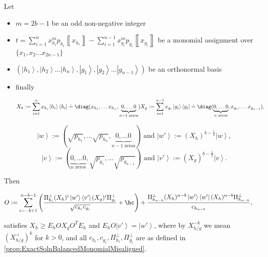 \documentclass{article}
\begin{document}
\begin{proposition}
  \label{prop:ExactSolnUnbalancedMonomialMisaligned}Let
  \begin{itemize}
    \item $m=2b-1$ be an odd non-negative integer
    \item $
            t=\sum_{i=1}^{n}x_{h_{i}}^{m}p_{h_{i}}\left\llbracket x_{h_{i}}\right\rrbracket -\sum_{i=1}^{n-1}x_{g_{i}}^{m}p_{g_{i}}\left\llbracket x_{g_{i}}\right\rrbracket
          $ be a monomial assignment over $\{x_{1},x_{2}\dots x_{2n-1}\}$
    \item $\left(\left|h_{1}\right\rangle ,\left|h_{2}\right\rangle \dots\left|h_{n}\right\rangle ,\left|g_{1}\right\rangle ,\left|g_{2}\right\rangle \dots\left|g_{n-1}\right\rangle \right)$
          be an orthonormal basis
    \item finally
          \begin{footnotesize}
            \begin{displaymath}
              X_{h}:=\sum_{i=1}^{n}x_{h_{i}}\left|h_{i}\right\rangle \left\langle h_{i}\right|\doteq\diag(x_{h_{1}},\dots x_{h_{n}},\underbrace{0,\dots0}_{n-1\text{ zeros}})
              X_{g}:=\sum_{i=1}^{n-1}x_{g_{i}}\left|g_{i}\right\rangle \left\langle g_{i}\right|\doteq\diag(\underbrace{0,\dots0}_{n\text{ zeros}},x_{g_{1}},\dots x_{g_{n-1}}),
            \end{displaymath}
          \end{footnotesize}\begin{displaymath}
            \left|w\right\rangle :=(\sqrt{p_{h_{1}}},\dots\sqrt{p_{h_{n}}},\underbrace{0,\dots0}_{n-1\text{ zeros}}) \text{ and }\left|w'\right\rangle :=(X_{h})^{b-\frac{1}{2}}\left|w\right\rangle,
          \end{displaymath}
          \begin{displaymath}
            \left|v\right\rangle :=(\underbrace{0,\dots0}_{n\text{ zeros}},\sqrt{p_{g_{1}}},\dots\sqrt{p_{g_{n-1}}}) \text{ and }\left|v'\right\rangle :=(X_{g})^{b-\frac{1}{2}}\left|v\right\rangle.
          \end{displaymath}

  \end{itemize}
  Then
  \begin{footnotesize}
    \begin{align*}
      O  :=\sum_{i=-b+1}^{n-b-1}\left(\frac{\Pi_{h_{i}}^{\perp}(X_{h})^{i}\left|w'\right\rangle \left\langle v'\right|(X_{g})^{i}\Pi_{g_{i}}^{\perp}}{\sqrt{c_{h_{i}}c_{g_{i}}}}+\hc\right) +\frac{\Pi_{h_{n-b}}^{\perp}(X_{h})^{n-b}\left|w'\right\rangle \left\langle w'\right|(X_{h})^{n-b}\Pi_{h_{n-b}}^{\perp}}{c_{h_{n-b}}},
    \end{align*}
  \end{footnotesize}
  satisfies $X_{h}\ge E_{h}OX_{g}O^{T}E_{h}$ and $E_{h}O\left|v'\right\rangle =\left|w'\right\rangle $,
  where by $X_{h/g}^{-k}$ we mean $(X_{h/g}^{\dashv})^{k}$
  for $k>0$, and all $c_{h_{i}},c_{g_{i}},\Pi_{h_{i}}^{\perp},\Pi_{g_{i}}^{\perp}$
  are as defined in \cref{prop:ExactSolnBalancedMonomialMisaligned}.
\end{proposition}
\end{document}
